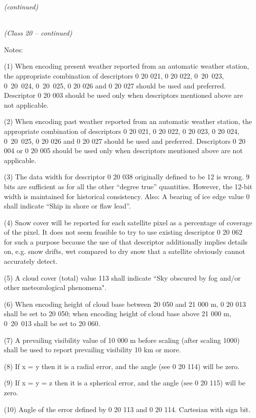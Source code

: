 \emph{(continued)}

\emph{\\
(Class 20 -- continued)}

Notes:

(1) When encoding present weather reported from an automatic weather station, the appropriate combination of descriptors 0 20 021, 0 20 022, 0~20~023, 0~20~024, 0~20~025, 0 20 026 and 0 20 027 should be used and preferred. Descriptor 0 20 003 should be used only when descriptors mentioned above are not applicable.

(2) When encoding past weather reported from an automatic weather station, the appropriate combination of descriptors 0 20 021, 0 20 022, 0 20 023, 0 20 024, 0~20~025, 0 20 026 and 0 20 027 should be used and preferred. Descriptors 0 20 004 or 0 20 005 should be used only when descriptors mentioned above are not applicable.

(3) The data width for descriptor 0 20 038 originally defined to be 12 is wrong. 9 bits are sufficient as for all the other ``degree true'' quantities. However, the 12-bit width is maintained for historical consistency. Also: A bearing of ice edge value 0 shall indicate ``Ship in shore or flaw lead''.

(4) Snow cover will be reported for each satellite pixel as a percentage of coverage of the pixel. It does not seem feasible to try to use existing descriptor 0 20 062 for such a purpose because the use of that descriptor additionally implies details on, e.g. snow drifts, wet compared to dry snow that a satellite obviously cannot accurately detect.

(5) A cloud cover (total) value 113 shall indicate ``Sky obscured by fog and/or other meteorological phenomena".

(6) When encoding height of cloud base between 20 050 and 21 000 m, 0 20 013 shall be set to 20 050; when encoding height of cloud base above 21 000 m, 0~20~013 shall be set to 20 060.

(7) A prevailing visibility value of 10 000 m before scaling (after scaling 1000) shall be used to report prevailing visibility 10 km or more.

(8) If x = y then it is a radial error, and the angle (see 0 20 114) will be zero.

(9) If x = y = z then it is a spherical error, and the angle (see 0 20 115) will be zero.

(10) Angle of the error defined by 0 20 113 and 0 20 114. Cartesian with sign bit.

